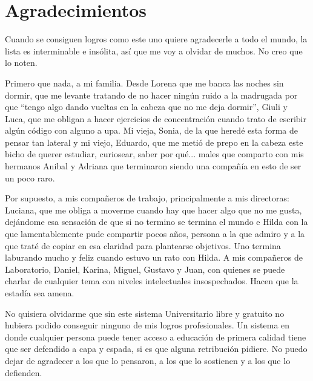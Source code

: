 
\chapter*{Agradecimientos}

Cuando se consiguen logros como este uno quiere agradecerle a todo el mundo, la lista es interminable e insólita, así que me voy a olvidar de muchos.
No creo que lo noten.

Primero que nada, a mi familia. Desde Lorena que me banca las noches sin dormir, que me levante tratando de no hacer ningún ruido a la madrugada por que ``tengo algo dando vueltas en la cabeza que no me deja dormir'', Giuli y Luca, que me obligan a hacer ejercicios de concentración cuando trato de escribir algún código con alguno a upa. Mi vieja, Sonia, de la que heredé esta forma de pensar tan lateral y mi viejo, Eduardo, que me metió de prepo en la cabeza este bicho de querer estudiar, curiosear, saber por qué... males que comparto con mis hermanos Anibal y Adriana que terminaron siendo una compañía en esto de ser un poco raro.

Por supuesto, a mis compañeros de trabajo, principalmente a mis directoras: Luciana, que me obliga a moverme cuando hay que hacer algo que no me gusta, dejándome esa sensación de que si no termino se termina el mundo e Hilda con la que lamentablemente pude compartir pocos años, persona a la que admiro y a la que traté de copiar en esa claridad para plantearse objetivos. Uno termina laburando mucho y feliz cuando estuvo un rato con Hilda.
A mis compañeros de Laboratorio, Daniel, Karina, Miguel, Gustavo y Juan, con quienes se puede charlar de cualquier tema con niveles intelectuales insospechados. Hacen que la estadía sea amena.

No quisiera olvidarme que sin este sistema Universitario libre y gratuito no hubiera podido conseguir ninguno de mis logros profesionales. Un sistema en donde cualquier persona puede tener acceso a educación de primera calidad tiene que ser defendido a capa y espada, si es que alguna retribución pidiere. No puedo dejar de agradecer a los que lo pensaron, a los que lo sostienen y a los que lo defienden.